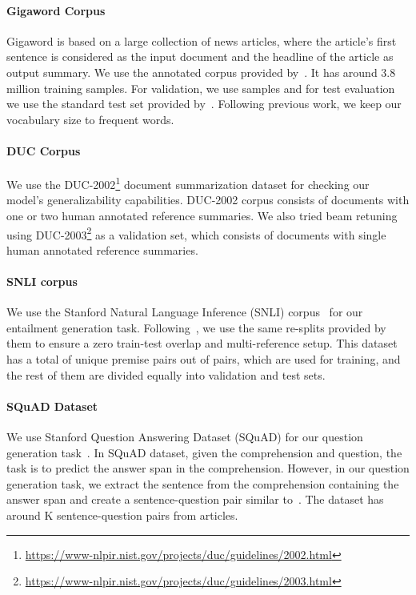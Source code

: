 \documentclass[11pt,a4paper]{article}
\begin{document}
\paragraph{Gigaword Corpus}
Gigaword is based on a large collection of news articles, where the article's first sentence is considered as the input document and the headline of the article as output summary. We use the annotated corpus provided by~. It has around 3.8 million training samples. For validation, we use  samples and for test evaluation we use the standard test set provided by~. Following previous work, we keep our vocabulary size to  frequent words.


\paragraph{DUC Corpus}
We use the DUC-2002\footnote{\scriptsize{\url{https://www-nlpir.nist.gov/projects/duc/guidelines/2002.html}}} document summarization dataset for checking our model's generalizability capabilities. DUC-2002 corpus consists of  documents with one or two human annotated reference summaries. We also tried beam retuning using DUC-2003\footnote{\scriptsize{\url{https://www-nlpir.nist.gov/projects/duc/guidelines/2003.html}}} as a validation set, which consists of  documents with single human annotated reference summaries.

\paragraph{SNLI corpus}
We use the Stanford Natural Language Inference (SNLI) corpus~\cite{bowman2015large} for our entailment generation task. Following~, we use the same re-splits provided by them to ensure a zero train-test overlap and multi-reference setup. This dataset has a total of  unique premise pairs out of  pairs, which are used for training, and the rest of them are divided equally into validation and test sets.

\paragraph{SQuAD Dataset}
We use Stanford Question Answering Dataset (SQuAD) for our question generation task~\cite{rajpurkar2016squad}. In SQuAD dataset, given the comprehension and question, the task is to predict the answer span in the comprehension. However, in our question generation task, we extract the sentence from the comprehension containing the answer span and create a sentence-question pair similar to~. The dataset has around K sentence-question pairs from  articles. 
\end{document}
